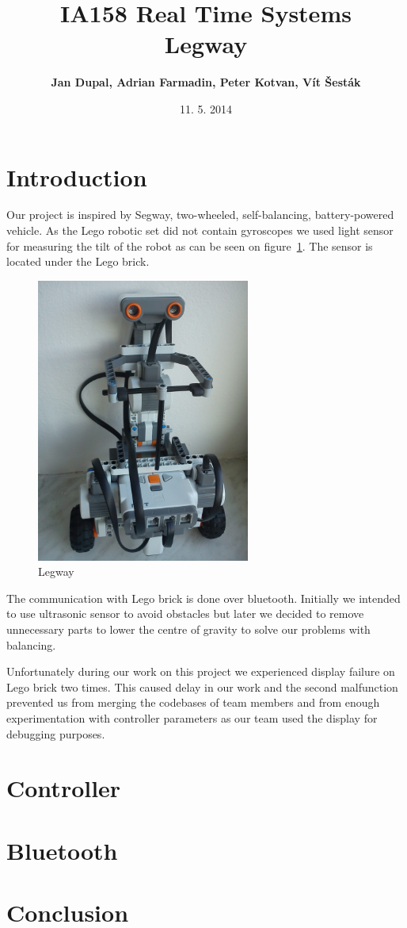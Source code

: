 \documentclass{article}
\title{
\textmd{IA158 Real Time Systems}\\
\textmd{\textbf{Legway}}
}
\author{\textbf{Jan Dupal, Adrian Farmadin, Peter Kotvan, Vít Šesták}}
\date{11. 5. 2014} %
\begin{document}
\maketitle

\section{Introduction}

Our project is inspired by Segway, two-wheeled, self-balancing, battery-powered
vehicle. \cite{segway} \cite{swiki} As the Lego robotic set did not contain
gyroscopes we used light sensor for measuring the tilt of the robot as can be
seen on figure~\ref{fig:legway}. The sensor is located under the Lego brick.

\begin{figure}[h]
    \centering
    \includegraphics[width=7cm, angle=270]{legway}
    \caption{Legway}
    \label{fig:legway}
\end{figure}

The communication with Lego brick is done over bluetooth. Initially we intended
to use ultrasonic sensor to avoid obstacles but later we decided to remove
unnecessary parts to lower the centre of gravity to solve our problems with
balancing.

Unfortunately during our work on this project we experienced display failure on
Lego brick two times. This caused delay in our work and the second malfunction
prevented us from merging the codebases of team members and from enough
experimentation with controller parameters as our team used the display for
debugging purposes.

\section{Controller}

\section{Bluetooth}

\section{Conclusion}

\printbibliography
\end{document}
